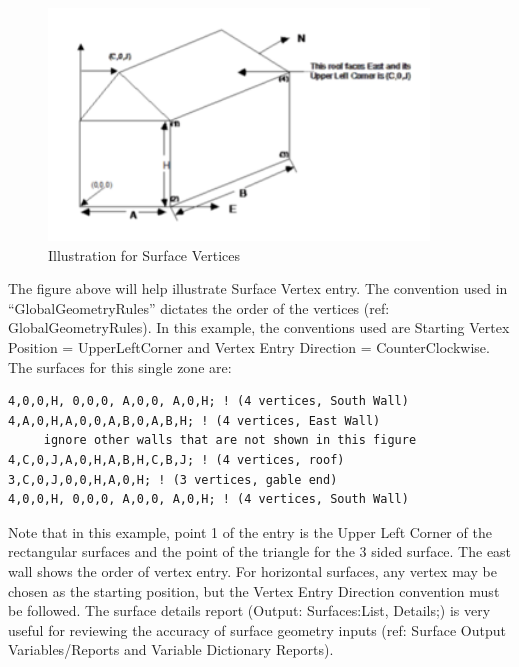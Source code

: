 \begin{callout}
\end{callout}

\begin{figure}[hbtp] %
\centering
\includegraphics[width=0.9\textwidth, height=0.9\textheight, keepaspectratio=true]{media/image055.png}
\caption{Illustration for Surface Vertices \protect \label{fig:illustration-for-surface-vertices}}
\end{figure}

The figure above will help illustrate Surface Vertex entry. The convention used in ``GlobalGeometryRules'' dictates the order of the vertices (ref: GlobalGeometryRules). In this example, the conventions used are Starting Vertex Position = UpperLeftCorner and Vertex Entry Direction = CounterClockwise. The surfaces for this single zone are:

\begin{lstlisting}
4,0,0,H, 0,0,0, A,0,0, A,0,H; ! (4 vertices, South Wall)
4,A,0,H,A,0,0,A,B,0,A,B,H; ! (4 vertices, East Wall)
     ignore other walls that are not shown in this figure
4,C,0,J,A,0,H,A,B,H,C,B,J; ! (4 vertices, roof)
3,C,0,J,0,0,H,A,0,H; ! (3 vertices, gable end)
4,0,0,H, 0,0,0, A,0,0, A,0,H; ! (4 vertices, South Wall)
\end{lstlisting}

Note that in this example, point 1 of the entry is the Upper Left Corner of the rectangular surfaces and the point of the triangle for the 3 sided surface. The east wall shows the order of vertex entry. For horizontal surfaces, any vertex may be chosen as the starting position, but the Vertex Entry Direction convention must be followed. The surface details report (Output: Surfaces:List, Details;) is very useful for reviewing the accuracy of surface geometry inputs (ref: Surface Output Variables/Reports and Variable Dictionary Reports).


